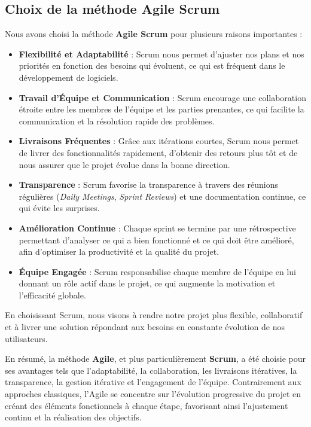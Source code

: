 \subsection{Choix de la méthode Agile Scrum}

Nous avons choisi la méthode \textbf{Agile Scrum} pour plusieurs raisons importantes :

\begin{itemize} [label=\textbullet]
    \item \textbf{Flexibilité et Adaptabilité} : Scrum nous permet d'ajuster nos plans et nos priorités en fonction des besoins qui évoluent, ce qui est fréquent dans le développement de logiciels.
    
    \item \textbf{Travail d'Équipe et Communication} : Scrum encourage une collaboration étroite entre les membres de l'équipe et les parties prenantes, ce qui facilite la communication et la résolution rapide des problèmes.
    
    \item \textbf{Livraisons Fréquentes} : Grâce aux itérations courtes, Scrum nous permet de livrer des fonctionnalités rapidement, d'obtenir des retours plus tôt et de nous assurer que le projet évolue dans la bonne direction.
    
    \item \textbf{Transparence} : Scrum favorise la transparence à travers des réunions régulières (\textit{Daily Meetings}, \textit{Sprint Reviews}) et une documentation continue, ce qui évite les surprises.
    
    \item \textbf{Amélioration Continue} : Chaque sprint se termine par une rétrospective permettant d'analyser ce qui a bien fonctionné et ce qui doit être amélioré, afin d'optimiser la productivité et la qualité du projet.
    
    \item \textbf{Équipe Engagée} : Scrum responsabilise chaque membre de l'équipe en lui donnant un rôle actif dans le projet, ce qui augmente la motivation et l'efficacité globale.
\end{itemize}

En choisissant Scrum, nous visons à rendre notre projet plus flexible, collaboratif et à livrer une solution répondant aux besoins en constante évolution de nos utilisateurs.

\medskip
En résumé, la méthode \textbf{Agile}, et plus particulièrement \textbf{Scrum}, a été choisie pour ses avantages tels que l'adaptabilité, la collaboration, les livraisons itératives, la transparence, la gestion itérative et l'engagement de l'équipe. Contrairement aux approches classiques, l'Agile se concentre sur l'évolution progressive du projet en créant des éléments fonctionnels à chaque étape, favorisant ainsi l'ajustement continu et la réalisation des objectifs.









